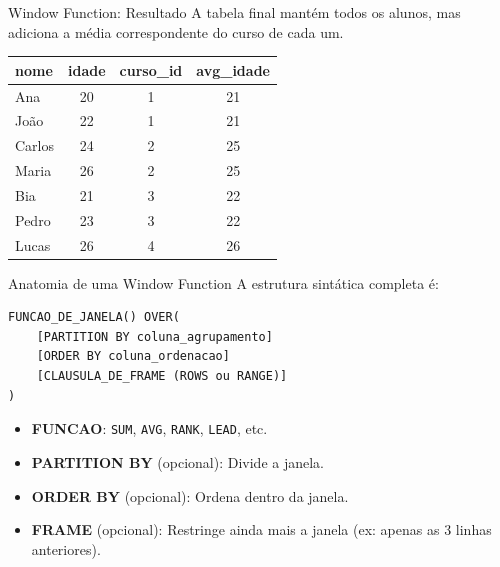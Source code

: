 \documentclass[9pt]{beamer}
\begin{document}
\begin{frame}{Window Function: Resultado}
    A tabela final mantém todos os alunos, mas adiciona a média correspondente do curso de cada um.
    
    \vspace{0.5cm}
    \begin{center}
        \begin{tabular}{|l|c|c|c|}
            \hline
            \textbf{nome} & \textbf{idade} & \textbf{curso\_id} & \textbf{avg\_idade} \\
            \hline
            Ana & 20 & 1 & 21 \\
            João & 22 & 1 & 21 \\
            \hline
            Carlos & 24 & 2 & 25 \\
            Maria & 26 & 2 & 25 \\
            \hline
            Bia & 21 & 3 & 22 \\
            Pedro & 23 & 3 & 22 \\
            \hline
            Lucas & 26 & 4 & 26 \\
            \hline
        \end{tabular}
    \end{center}
\end{frame}

\begin{frame}[fragile]{Anatomia de uma Window Function}
    A estrutura sintática completa é:
    
    \begin{lstlisting}
FUNCAO_DE_JANELA() OVER(
    [PARTITION BY coluna_agrupamento]
    [ORDER BY coluna_ordenacao]
    [CLAUSULA_DE_FRAME (ROWS ou RANGE)]
)
    \end{lstlisting}
    
    \begin{itemize}
        \item \textbf{FUNCAO}: \texttt{SUM}, \texttt{AVG}, \texttt{RANK}, \texttt{LEAD}, etc.
        \item \textbf{PARTITION BY} (opcional): Divide a janela.
        \item \textbf{ORDER BY} (opcional): Ordena dentro da janela.
        \item \textbf{FRAME} (opcional): Restringe ainda mais a janela (ex: apenas as 3 linhas anteriores).
    \end{itemize}
\end{frame}
\end{document}
